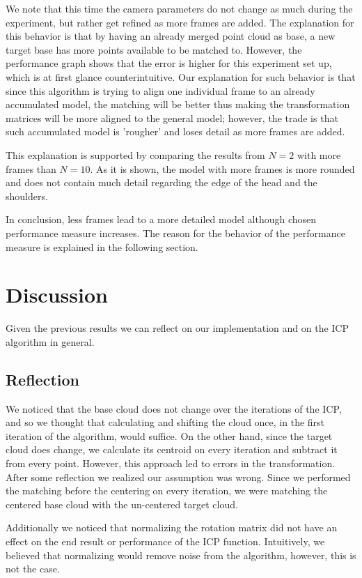 \documentclass[11pt]{article}
\begin{document}
We note that this time the camera parameters do not change as much during the experiment, but rather get refined as more frames are added. The explanation for this behavior is that by having an already merged point cloud as base, a new target base has more points available to be matched to. However, the performance graph shows that the error is higher for this experiment set up, which is at first glance counterintuitive. Our explanation for such behavior is that since this algorithm is trying to align one individual frame to an already accumulated model, the matching will be better thus making the transformation matrices will be more aligned to the general model; however, the trade is that such accumulated model is 'rougher' and loses detail as more frames are added. 

This explanation is supported by comparing the results from $N = 2$ with more frames than $N = 10$. As it is shown, the model with more frames is more rounded and does not contain much detail regarding the edge of the head and the shoulders. 

In conclusion, less frames lead to a more detailed model although chosen performance measure increases. The reason for the behavior of the performance measure is explained in the following section.

\section{Discussion}
\label{reflection}
Given the previous results we can reflect on our implementation and on the ICP algorithm in general.

\subsection{Reflection}
We noticed that the base cloud does not change over the iterations of the ICP, and so we thought that calculating and shifting the cloud once, in the first iteration of the algorithm, would suffice. On the other hand, since the target cloud does change, we calculate its centroid on every iteration and subtract it from every point. However, this approach led to errors in the transformation. After some reflection we realized our assumption was wrong. Since we performed the matching before the centering on every iteration, we were matching the centered base cloud with the un-centered target cloud.

Additionally we noticed that normalizing the rotation matrix did not have an effect on the end result or performance of the ICP function. Intuitively, we believed that normalizing would remove noise from the algorithm, however, this is not the case. 
\end{document}
